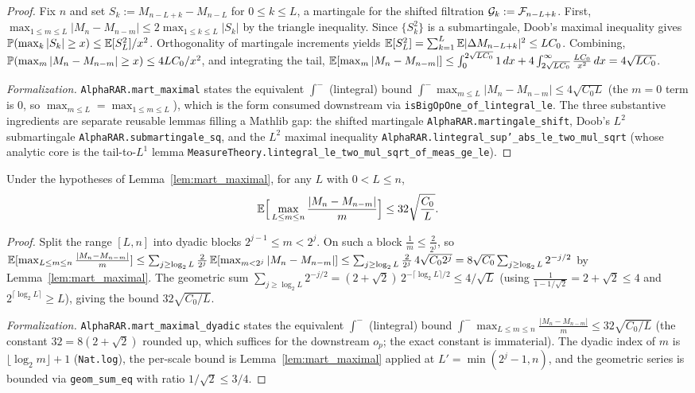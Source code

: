 \begin{proof}\leanok
Fix $n$ and set $S_k := M_{n-L+k} - M_{n-L}$ for $0 \le k \le L$, a martingale for
the shifted filtration $\mathcal{G}_k := \mathcal{F}_{n-L+k}$. First,
$\max_{1\le m\le L}|M_n - M_{n-m}| \le 2\max_{1\le k\le L}|S_k|$ by the triangle
inequality. Since $\{S_k^2\}$ is a submartingale, Doob's maximal inequality gives
$\mathbb{P}(\max_k |S_k| \ge x) \le \mathbb{E}[S_L^2]/x^2$. Orthogonality of martingale
increments yields $\mathbb{E}[S_L^2] = \sum_{k=1}^L \mathbb{E}|\Delta M_{n-L+k}|^2 \le L C_0$.
Combining, $\mathbb{P}(\max_m |M_n - M_{n-m}| \ge x) \le 4 L C_0 / x^2$, and integrating
the tail,
$\mathbb{E}[\max_m |M_n-M_{n-m}|] \le \int_0^{2\sqrt{LC_0}} 1\,dx
 + 4\int_{2\sqrt{LC_0}}^\infty \frac{LC_0}{x^2}\,dx = 4\sqrt{LC_0}$.

\emph{Formalization.} \texttt{AlphaRAR.mart\_maximal} states the equivalent $\int^-$ (lintegral)
bound $\int^- \max_{m\le L}|M_n - M_{n-m}| \le 4\sqrt{C_0 L}$ (the $m=0$ term is $0$, so
$\max_{m\le L}=\max_{1\le m\le L}$), which is the form consumed downstream via
\texttt{isBigOpOne\_of\_lintegral\_le}. The three substantive ingredients are separate reusable
lemmas filling a Mathlib gap: the shifted martingale \texttt{AlphaRAR.martingale\_shift}, Doob's
$L^2$ submartingale \texttt{AlphaRAR.submartingale\_sq}, and the $L^2$ maximal inequality
\texttt{AlphaRAR.lintegral\_sup'\_abs\_le\_two\_mul\_sqrt} (whose analytic core is the tail-to-$L^1$
lemma \texttt{MeasureTheory.lintegral\_le\_two\_mul\_sqrt\_of\_meas\_ge\_le}).
\end{proof}

\begin{lemma}\label{lem:mart_maximal_dyadic}
\leanok
Under the hypotheses of Lemma~\ref{lem:mart_maximal}, for any $L$ with
$0 < L \le n$,
\[
  \mathbb{E}\Big[\max_{L \le m \le n} \frac{|M_n - M_{n-m}|}{m}\Big] \le 32\sqrt{\frac{C_0}{L}}.
\]
\end{lemma}

\begin{proof}\leanok
{}
Split the range $[L,n]$ into dyadic blocks $2^{j-1} \le m < 2^j$. On such a block
$\frac1m \le \frac{2}{2^j}$, so
$\mathbb{E}[\max_{L\le m\le n}\frac{|M_n-M_{n-m}|}{m}]
 \le \sum_{j \ge \log_2 L} \frac{2}{2^j}\, \mathbb{E}[\max_{m<2^j}|M_n-M_{n-m}|]
 \le \sum_{j\ge\log_2 L} \frac{2}{2^j}\, 4\sqrt{C_0 2^j}
 = 8\sqrt{C_0}\sum_{j\ge\log_2 L} 2^{-j/2}$
by Lemma~\ref{lem:mart_maximal}. The geometric sum
$\sum_{j\ge\log_2 L} 2^{-j/2} = (2+\sqrt2)\,2^{-\lceil\log_2 L\rceil/2} \le 4/\sqrt L$
(using $\tfrac1{1-1/\sqrt2} = 2+\sqrt2 \le 4$ and $2^{\lceil\log_2 L\rceil}\ge L$), giving the bound
$32\sqrt{C_0/L}$.

\emph{Formalization.} \texttt{AlphaRAR.mart\_maximal\_dyadic} states the equivalent $\int^-$
(lintegral) bound $\int^- \max_{L\le m\le n}\frac{|M_n-M_{n-m}|}{m} \le 32\sqrt{C_0/L}$ (the
constant $32 = 8(2+\sqrt2)$ rounded up, which suffices for the downstream $o_p$; the exact
constant is immaterial). The dyadic index of $m$ is $\lfloor\log_2 m\rfloor+1$ (\texttt{Nat.log}),
the per-scale bound is Lemma~\ref{lem:mart_maximal} applied at $L' = \min(2^j-1,n)$, and the
geometric series is bounded via \texttt{geom\_sum\_eq} with ratio $1/\sqrt2 \le 3/4$.
\end{proof}

